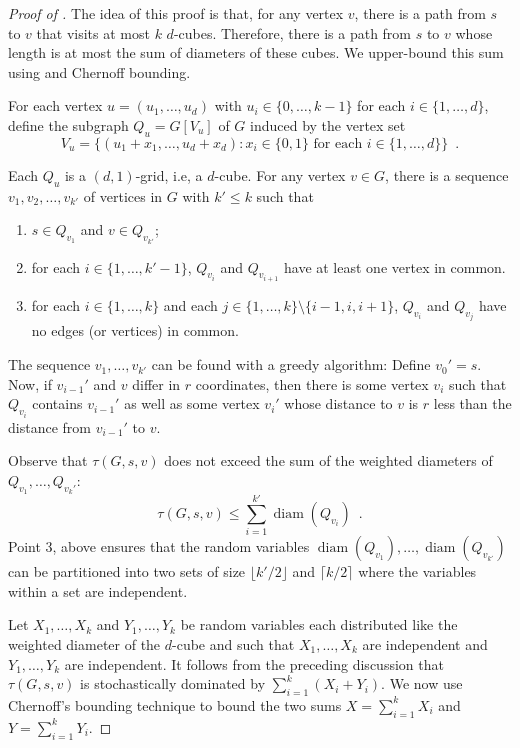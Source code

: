 \documentclass{patmorin}
\DeclareMathOperator{\diam}{diam}
\begin{document}
\begin{proof}[Proof of ]
The idea of this proof is that, for any vertex $v$, there is a path
from $s$ to $v$ that visits at most $k$ $d$-cubes. Therefore, there is
a path from $s$ to $v$ whose length is at most the sum of diameters
of these cubes.  We upper-bound this sum using 
and Chernoff bounding.

For each vertex $u=(u_1,\ldots,u_d)$ with $u_i\in\{0,\ldots,k-1\}$
for each $i\in\{1,\ldots,d\}$, define the subgraph
$Q_u=G[V_u]$ of $G$ induced by the vertex set
\[
    V_u = \{(u_1+x_1,\ldots,u_d+x_d) :\text{$x_i\in\{0,1\}$ for each $i\in\{1,\ldots,d\}$}\} \enspace .
\]

Each $Q_u$ is a $(d,1)$-grid, i.e, a $d$-cube.  For any vertex $v\in
G$, there is a sequence $v_1,v_2,\ldots,v_{k'}$ of vertices in $G$
with $k'\le k$ such that
\begin{enumerate}
  \item $s\in Q_{v_1}$ and $v\in Q_{v_{k'}}$; 
  \item for each $i\in\{1,\ldots,k'-1\}$, $Q_{v_{i}}$ and $Q_{v_{i+1}}$ have at least one
vertex in common.
  \item for each $i\in\{1,\ldots,k\}$ and each $j\in\{1,\ldots,k\}\setminus\{i-1,i,i+1\}$, $Q_{v_i}$ and $Q_{v_j}$ have no edges (or vertices) in common.
\end{enumerate}
The sequence $v_1,\ldots,v_{k'}$ can be found with a greedy algorithm:
Define $v_0'=s$.  Now, if $v_{i-1}'$ and $v$ differ in $r$ coordinates,
then there is some vertex $v_i$ such that $Q_{v_i}$ contains $v_{i-1}'$
as well as some vertex $v_i'$ whose distance to $v$ is $r$ less than
the distance from $v_{i-1}'$ to $v$.

Observe that $\tau(G,s,v)$ does not exceed the sum of the weighted diameters of
$Q_{v_1},\ldots,Q_{v_k'}$:
\[
   \tau(G,s,v) \le \sum_{i=1}^{k'} \diam(Q_{v_i}) \enspace .
\]
Point 3, above ensures that the random variables
$\diam(Q_{v_1}),\ldots,\diam(Q_{v_{k'}})$ can be partitioned into two
sets of size $\lfloor k'/2\rfloor$ and $\lceil k/2\rceil$
where the variables within a set are independent.

Let $X_1,\ldots,X_k$ and $Y_1,\ldots,Y_k$ be random variables each
distributed like the weighted diameter of the $d$-cube and such that
$X_1,\ldots,X_k$ are independent and $Y_1,\ldots,Y_k$ are independent.
It follows from the preceding discussion that $\tau(G,s,v)$ is
stochastically dominated by $\sum_{i=1}^k (X_i+Y_i)$.  We now use
Chernoff's bounding technique to bound the two sums $X=\sum_{i=1}^k X_i$
and $Y=\sum_{i=1}^k Y_i$.


\end{proof}
\end{document}
